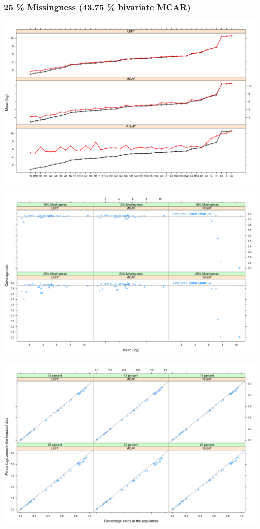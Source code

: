 \documentclass[aspectratio=169]{beamer} %
\begin{document}
  \begin{frame}
     \frametitle{25 \% Missingness (43.75 \% bivariate MCAR)}
  \centering
\includegraphics[scale=.3]{plot25.pdf}
 \end{frame}
 
  \begin{frame}
  \centering
\includegraphics[scale=.3]{plotcov.pdf}
 \end{frame}
 
  \begin{frame}
  \centering
\includegraphics[scale=.3]{plotzero.pdf}
 \end{frame}
 
\end{document}
